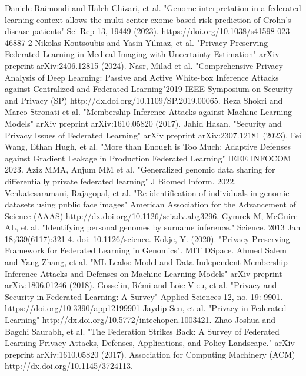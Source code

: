\documentclass[conference]{IEEEtran}
\begin{document}
\begin{thebibliography}{00}
 Daniele Raimondi and Haleh Chizari, et al. "Genome interpretation in a federated learning context allows the multi-center exome-based risk prediction of Crohn’s disease patients" Sci Rep 13, 19449 (2023). https://doi.org/10.1038/s41598-023-46887-2
 Nikolas Koutsoubis and Yasin Yilmaz, et al. "Privacy Preserving Federated Learning in Medical Imaging with Uncertainty Estimation" arXiv preprint arXiv:2406.12815 (2024).
 Nasr, Milad et al. "Comprehensive Privacy Analysis of Deep Learning: Passive and Active White-box Inference Attacks against Centralized and Federated Learning"2019 IEEE Symposium on Security and Privacy (SP) http://dx.doi.org/10.1109/SP.2019.00065.
 Reza Shokri and Marco Stronati et al. "Membership Inference Attacks against Machine Learning Models" arXiv preprint arXiv:1610.05820 (2017).
 Jahid Hasan. "Security and Privacy Issues of Federated Learning" arXiv preprint arXiv:2307.12181 (2023).
 Fei Wang, Ethan Hugh, et al. "More than Enough is Too Much: Adaptive Defenses against Gradient Leakage in Production Federated Learning" IEEE INFOCOM 2023.
 Aziz MMA, Anjum MM et al. "Generalized genomic data sharing for differentially private federated learning"  J Biomed Inform. 2022.
 Venkatesaramani, Rajagopal, et al. "Re-identification of individuals in genomic datasets using public face images" American Association for the Advancement of Science (AAAS) http://dx.doi.org/10.1126/sciadv.abg3296.
 Gymrek M, McGuire AL, et al. "Identifying personal genomes by surname inference." Science. 2013 Jan 18;339(6117):321-4. doi: 10.1126/science.
 Kokje, Y. (2020). "Privacy Preserving Framework for Federated Learning in Genomics". MIT DSpace.
 Ahmed Salem and Yang Zhang, et al. "ML-Leaks: Model and Data Independent Membership Inference Attacks and Defenses on Machine Learning Models" arXiv preprint arXiv:1806.01246 (2018).
 Gosselin, Rémi and Loïc Vieu, et al. "Privacy and Security in Federated Learning: A Survey" Applied Sciences 12, no. 19: 9901. https://doi.org/10.3390/app12199901
 Jaydip Sen, et al. "Privacy in Federated Learning" http://dx.doi.org/10.5772/intechopen.1003421. 
 Zhao Joshua and Bagchi Saurabh, et al. "The Federation Strikes Back: A Survey of Federated Learning Privacy Attacks, Defenses, Applications, and Policy Landscape." arXiv preprint arXiv:1610.05820 (2017). Association for Computing Machinery (ACM) http://dx.doi.org/10.1145/3724113.

\end{thebibliography}
\end{document}
